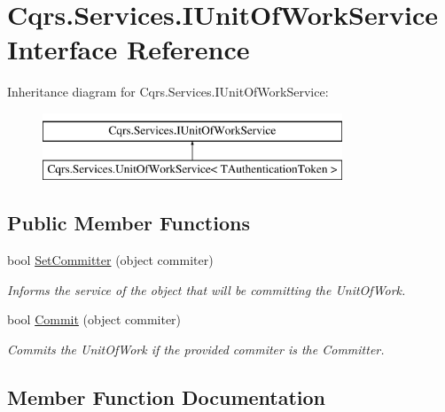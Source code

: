 \hypertarget{interfaceCqrs_1_1Services_1_1IUnitOfWorkService}{}\section{Cqrs.\+Services.\+I\+Unit\+Of\+Work\+Service Interface Reference}
\label{interfaceCqrs_1_1Services_1_1IUnitOfWorkService}
Inheritance diagram for Cqrs.\+Services.\+I\+Unit\+Of\+Work\+Service\+:\begin{figure}[H]
\begin{center}
\leavevmode
\includegraphics[height=2.000000cm]{interfaceCqrs_1_1Services_1_1IUnitOfWorkService}
\end{center}
\end{figure}
\subsection*{Public Member Functions}
\begin{DoxyCompactItemize}
\item 
bool \hyperlink{interfaceCqrs_1_1Services_1_1IUnitOfWorkService_a54f241cd90bbebf9cc73d5a296ed593b_a54f241cd90bbebf9cc73d5a296ed593b}{Set\+Committer} (object commiter)
\begin{DoxyCompactList}\small\item\em Informs the service of the object that will be committing the Unit\+Of\+Work. \end{DoxyCompactList}\item 
bool \hyperlink{interfaceCqrs_1_1Services_1_1IUnitOfWorkService_a3bd8a6a931fc6f457d136d979d26cead_a3bd8a6a931fc6f457d136d979d26cead}{Commit} (object commiter)
\begin{DoxyCompactList}\small\item\em Commits the Unit\+Of\+Work if the provided {\itshape commiter}  is the Committer. \end{DoxyCompactList}\end{DoxyCompactItemize}


\subsection{Member Function Documentation}
\mbox{\label{interfaceCqrs_1_1Services_1_1IUnitOfWorkService_a3bd8a6a931fc6f457d136d979d26cead_a3bd8a6a931fc6f457d136d979d26cead}} 
